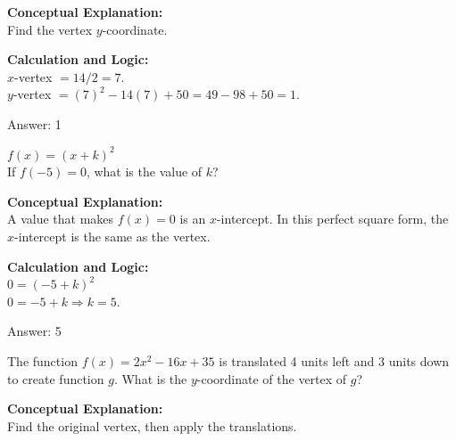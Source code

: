 \documentclass[11pt,paper=a4,answers]{exam}
\begin{document}
\begin{questions}
\begin{solution}
\textbf{Conceptual Explanation:} \\
Find the vertex $y$-coordinate.

\vspace{20pt}

\textbf{Calculation and Logic:} \\
$x$-vertex $= 14/2 = 7$. \\
$y$-vertex $= (7)^2 - 14(7) + 50 = 49 - 98 + 50 = 1$.

\vspace{25pt}

Answer: \colorbox{yellow!100}{1}
\end{solution}

\vspace{40pt}

\question
$f(x) = (x+k)^2$ \\
If $f(-5) = 0$, what is the value of $k$?

\begin{solution}
\textbf{Conceptual Explanation:} \\
A value that makes $f(x)=0$ is an $x$-intercept. In this perfect square form, the $x$-intercept is the same as the vertex.

\vspace{20pt}

\textbf{Calculation and Logic:} \\
$0 = (-5 + k)^2$ \\
$0 = -5 + k \Rightarrow k = 5$.

\vspace{25pt}

Answer: \colorbox{yellow!100}{5}
\end{solution}

\vspace{40pt}

\question
The function $f(x) = 2x^2 - 16x + 35$ is translated 4 units left and 3 units down to create function $g$. What is the $y$-coordinate of the vertex of $g$?

\begin{solution}
\textbf{Conceptual Explanation:} \\
Find the original vertex, then apply the translations.

\vspace{20pt}


\end{solution}
\end{questions}
\end{document}
